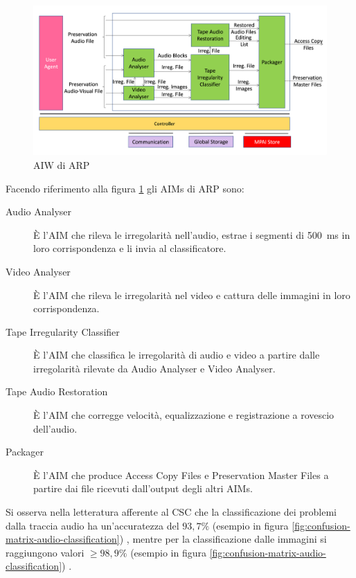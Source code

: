 \begin{figure}[H]
    \centering
    \includegraphics[width=\textwidth]{img/arp-workflow.png}
    \caption{\ac{AIW} di \acl{ARP}}
    \label{fig:arp-workflow}
\end{figure}

Facendo riferimento alla figura \ref{fig:arp-workflow} gli \acp{AIM} di \ac{ARP} sono:
\begin{description}
    \item[Audio Analyser] È l'\ac{AIM} che rileva le irregolarità nell'audio, estrae i segmenti di \qty{500}{\ms} in loro corrispondenza e li invia al classificatore.
    \item[Video Analyser] È l'\ac{AIM} che rileva le irregolarità nel video e cattura delle immagini in loro corrispondenza.
    \item[Tape Irregularity Classifier] È l'\ac{AIM} che classifica le irregolarità di audio e video a partire dalle irregolarità rilevate da Audio Analyser e Video Analyser.   %
    \item[Tape Audio Restoration] È l'\ac{AIM} che corregge velocità, equalizzazione e registrazione a rovescio dell'audio.
    \item[Packager] È l'\ac{AIM} che produce Access Copy Files e Preservation Master Files a partire dai file ricevuti dall'output degli altri \acp{AIM}.
\end{description}

Si osserva nella letteratura afferente al \ac{CSC} che la classificazione dei problemi dalla traccia audio ha un'accuratezza del $93,7\%$ (esempio in figura \ref{fig:confusion-matrix-audio-classification}) \cite[min. 35:10]{mpaistandardsMPAIPresentsContextbased2023}, mentre per la classificazione dalle immagini si raggiungono valori $\geq 98,9\%$ (esempio in figura \ref{fig:confusion-matrix-audio-classification}) \cite[fig. 3 e p. 70]{prettoComputingMethodologiesSupporting2018}.

